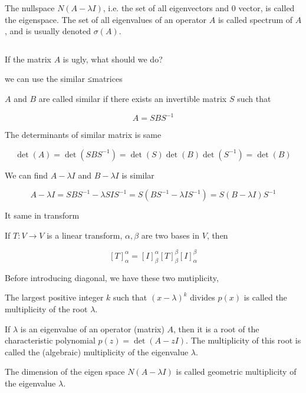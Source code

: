 \begin{defn}
	The nullspace $N(A - \lambda I)$, i.e. the set of all eigenvectors and $0$ vector, is called the eigenspace. The set of all eigenvalues of an operator $A$ is called spectrum of $A$, and is usually denoted $\sigma (A)$.
\end{defn}

\begin{rmk*} $ $

	If the matrix $A$ is ugly, what should we do?
	
	we can use the similar ≤matrices
	
	$A$ and $B$ are called similar if there exists an invertible matrix $S$ such that 
	
	$$ A = SBS^{-1}$$
	
	The determinants of similar matrix is same
	
	$$\det(A) = \det(SBS^{-1}) = \det(S)\det(B)\det(S^{-1}) = \det(B)$$
	
	We can find $A-\lambda I$ and $B -\lambda I$ is similar
	
	$$A - \lambda I = SBS^{-1} - \lambda SIS^{-1} = S(BS^{-1} - \lambda I S^{-1}) = S(B-\lambda I)S^{-1}$$
	
	It same in transform
	
	If $T:V\rightarrow V$ is a linear transform, $\alpha,\beta$ are two bases in $V$, then
	
	$$[T]^{\alpha}_{\alpha} = [I]^{\alpha}_{\beta}[T]^{\beta}_{\beta}[I]^{\beta}_{\alpha} $$
	
	
\end{rmk*}

\begin{tcolorbox}
	Before introducing diagonal, we have these two mutiplicity, 
\end{tcolorbox}

\begin{defn}
	The largest positive integer $k$ such that $(x - \lambda)^k$ divides $p(x)$ is called the multiplicity of the root $\lambda$.
	
	If $\lambda$ is an eigenvalue of an operator (matrix) $A$, then it is a root of the characteristic polynomial $p(z) = \det(A - zI)$. The multiplicity of this root is called the (algebraic) multiplicity of the eigenvalue $\lambda$.
\end{defn}

\begin{defn}
	The dimension of the eigen space $N(A - \lambda I)$ is called geometric multiplicity of the eigenvalue $\lambda$.
\end{defn}

